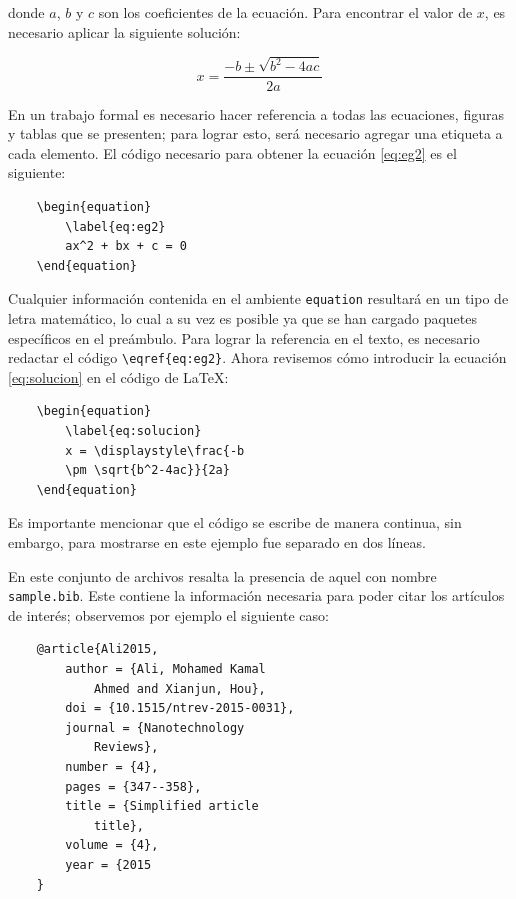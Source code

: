 \documentclass[fleqn,10pt]{SelfArx} %
\begin{document}
\noindent donde $a$, $b$ y $c$ son los coeficientes de la ecuación. Para encontrar el valor de $x$, es necesario aplicar la siguiente solución:

\begin{equation}
    \label{eq:solucion}
    x = \displaystyle\frac{-b \pm \sqrt{b^2-4ac}}{2a}
\end{equation}

En un trabajo formal es necesario hacer referencia a todas las ecuaciones, figuras y tablas que se presenten; para lograr esto, será necesario agregar una etiqueta a cada elemento. El código necesario para obtener la ecuación \eqref{eq:eg2} es el siguiente:

\begin{verbatim}
    \begin{equation}
        \label{eq:eg2}
        ax^2 + bx + c = 0
    \end{equation}
\end{verbatim}

\noindent Cualquier información contenida en el ambiente \texttt{equation} resultará en un tipo de letra matemático, lo cual a su vez es posible ya que se han cargado paquetes específicos en el preámbulo. Para lograr la referencia en el texto, es necesario redactar el código \verb|\eqref{eq:eg2}|. Ahora revisemos cómo introducir la ecuación \eqref{eq:solucion} en el código de \LaTeX:

\begin{verbatim}
    \begin{equation}
        \label{eq:solucion}
        x = \displaystyle\frac{-b 
        \pm \sqrt{b^2-4ac}}{2a}
    \end{equation}
\end{verbatim}

\noindent Es importante mencionar que el código se escribe de manera continua, sin embargo, para mostrarse en este ejemplo fue separado en dos líneas.

En este conjunto de archivos resalta la presencia de aquel con nombre \texttt{sample.bib}. Este contiene la información necesaria para poder citar los artículos de interés; observemos por ejemplo el siguiente caso:

\begin{verbatim}
    @article{Ali2015,
        author = {Ali, Mohamed Kamal 
            Ahmed and Xianjun, Hou},
        doi = {10.1515/ntrev-2015-0031},
        journal = {Nanotechnology 
            Reviews},
        number = {4},
        pages = {347--358},
        title = {Simplified article
            title},
        volume = {4},
        year = {2015
    }
\end{verbatim}
\end{document}
